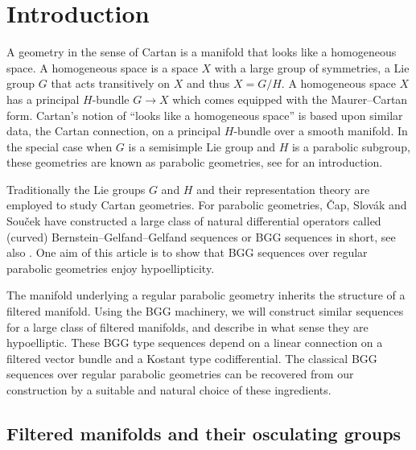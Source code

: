 \documentclass[reqno,12pt]{amsart}
\theoremstyle{plain}
\theoremstyle{definition}
\begin{document}

\maketitle
\tableofcontents




\section{Introduction}\label{S:intro}





A geometry in the sense of Cartan is a manifold that looks like a homogeneous space.
A homogeneous space is a space $X$ with a large group of symmetries, a Lie group $G$ that acts transitively on $X$ and thus $X=G/H$.
A homogeneous space $X$ has a principal $H$-bundle $G\rightarrow X$ which comes equipped with the Maurer--Cartan form.
Cartan's notion of ``looks like a homogeneous space'' is based upon similar data, the Cartan connection, on a principal $H$-bundle over a smooth manifold.
In the special case when $G$ is a semisimple Lie group and $H$ is a parabolic subgroup, these geometries are known as parabolic geometries, see \cite{CS09} for an introduction.


Traditionally the Lie groups $G$ and $H$ and their representation theory are employed to study Cartan geometries.
For parabolic geometries, \v Cap, Slov\'ak and Sou\v cek \cite{CSS01} have constructed a large class of natural differential operators called (curved) Bernstein--Gelfand--Gelfand sequences or BGG sequences in short, see also \cite{CD01,CS15}.
One aim of this article is to show that BGG sequences over regular parabolic geometries enjoy hypoellipticity.


The manifold underlying a regular parabolic geometry inherits the structure of a filtered manifold.
Using the BGG machinery, we will construct similar sequences for a large class of filtered manifolds, and describe in what sense they are hypoelliptic.
These BGG type sequences depend on a linear connection on a filtered vector bundle and a Kostant type codifferential.
The classical BGG sequences over regular parabolic geometries can be recovered from our construction by a suitable and natural choice of these ingredients.





\subsection{Filtered manifolds and their osculating groups}
\end{document}
